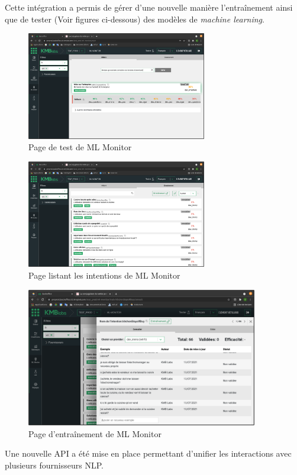 \documentclass[12pt,a4paper,oneside]{scrreprt}
\begin{document}
Cette intégration a permis de gérer d'une nouvelle manière l'entraînement ainsi que de tester (Voir figures ci-dessous) des modèles de \textit{machine learning}. 

\begin{figure}[!ht]
	\centering
	\includegraphics[width=0.7\textwidth]{pictures/mlmonitor_test.png}
	\caption{Page de test de ML Monitor}
	\label{fig:mlmonitor_test}
\end{figure}

\begin{figure}[!ht]
	\centering
	\includegraphics[width=0.7\textwidth]{pictures/mlmonitor_intentions.png}
	\caption{Page listant les intentions de ML Monitor}
	\label{fig:mlmonitor_intentions}
\end{figure}

\begin{figure}[!ht]
	\centering
	\includegraphics[width=0.9\textwidth]{pictures/mlmonitor_training.png}
	\caption{Page d'entraînement de ML Monitor}
	\label{fig:mlmonitor_training}
\end{figure}
\newpage
Une nouvelle API a été mise en place permettant d'unifier les interactions avec plusieurs fournisseurs NLP.
\end{document}
